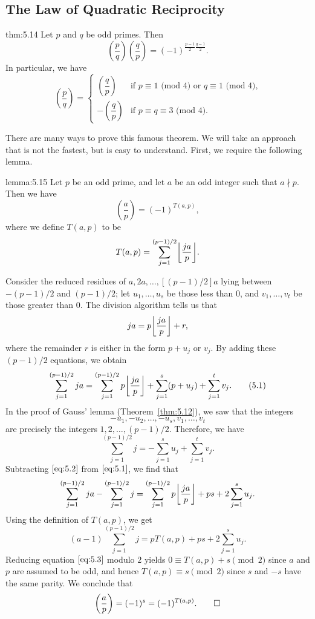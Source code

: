 \subsection{The Law of Quadratic Reciprocity}\label{subsec:5.4}

\vspace{2ex}
\begin{theo}{thm:5.14}
    Let $p$ and $q$ be odd primes. Then 
    \[ \left( \frac pq \right) \left( \frac qp \right) = (-1)^{\frac{p-1}2 \frac{q-1}2}. \] 
    In particular, we have 
    \[ \left( \frac pq \right) = \begin{cases}
        \left(\dfrac qp \right) & \text{if $p \equiv 1$ (mod $4$) or $q \equiv 1$ (mod $4$),} \\[2ex]
        -\left(\dfrac qp \right) & \text{if $p \equiv q \equiv 3$ (mod $4$).} 
    \end{cases} \] 
\end{theo}

There are many ways to prove this famous theorem. We will take an approach that is 
not the fastest, but is easy to understand. First, we require the following lemma. 

\begin{lemma}{lemma:5.15}
    Let $p$ be an odd prime, and let $a$ be an odd integer such that $a \nmid p$. 
    Then we have 
    \[ \left( \frac ap \right) = (-1)^{T(a, p)}, \] 
    where we define $T(a, p)$ to be 
    \[ T(a, p) = \sum_{j=1}^{(p-1)/2} \floor*{\frac{ja}{p}}. \] 
\end{lemma}
\begin{pf}
    Consider the reduced residues of $a, 2a, \dots, [(p-1)/2]a$ lying between 
    $-(p-1)/2$ and $(p-1)/2$; let $u_1, \dots, u_s$ be those less than $0$, 
    and $v_1, \dots, v_t$ be those greater than $0$. The division algorithm 
    tells us that 
    \[ ja = p\floor*{\frac{ja}{p}} + r, \] 
    where the remainder $r$ is either in the form $p + u_j$ or $v_j$. By 
    adding these $(p-1)/2$ equations, we obtain 
    \[ \sum_{j=1}^{(p-1)/2} ja = \sum_{j=1}^{(p-1)/2} p\floor*{\frac{ja}{p}} 
    + \sum_{j=1}^s (p + u_j) + \sum_{j=1}^t v_j. \tag{5.1}\label{eq:5.1} \] 
    In the proof of Gauss' lemma (Theorem~\ref{thm:5.12}), we saw that the integers 
    \[ -u_1, -u_2, \dots, -u_s, v_1, \dots, v_t \] 
    are precisely the integers $1, 2, \dots, (p-1)/2$. Therefore, we have 
    \[ \sum_{j=1}^{(p-1)/2} j = -\sum_{j=1}^s u_j + \sum_{j=1}^t v_j. 
    \tag{5.2}\label{eq:5.2} \] 
    Subtracting $\eqref{eq:5.2}$ from $\eqref{eq:5.1}$, we find that 
    \[ \sum_{j=1}^{(p-1)/2} ja - \sum_{j=1}^{(p-1)/2} j 
    = \sum_{j=1}^{(p-1)/2} p\floor*{\frac{ja}{p}} + ps + 2 \sum_{j=1}^s u_j. \] 
    Using the definition of $T(a, p)$, we get 
    \[ (a-1) \sum_{j=1}^{(p-1)/2} j = pT(a, p) + ps + 2\sum_{j=1}^s u_j. 
    \tag{5.3}\label{eq:5.3} \] 
    Reducing equation $\eqref{eq:5.3}$ modulo $2$ yields $0 \equiv T(a, p) 
    + s \pmod 2$ since $a$ and $p$ are assumed to be odd, and hence $T(a, p) 
    \equiv s \pmod 2$ since $s$ and $-s$ have the same parity. We conclude that 
    \[ \left( \frac ap \right) = (-1)^s = (-1)^{T(a, p)}. \qedhere \] 
\end{pf}

